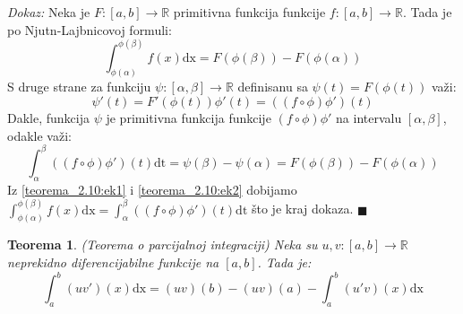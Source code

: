 \documentclass{article}
\newtheorem{teorema}{Teorema}[section]
\begin{document}
\textit{Dokaz:} Neka je $F:\left[a,b\right]\longrightarrow \mathbb{R}$ primitivna funkcija funkcije $f:\left[a,b\right]\longrightarrow\mathbb{R}$. Tada je po Njutn-Lajbnicovoj formuli:
\begin{equation}
    \label{teorema_2.10:ek1}
    \displaystyle\int^{\phi\left(\beta\right)}_{\phi\left(\alpha\right)}f\left(x\right)\text{dx} = F\left(\phi\left(\beta\right)\right)-F\left(\phi\left(\alpha\right)\right)
\end{equation}
S druge strane za funkciju $\psi:\left[\alpha,\beta\right]\longrightarrow\mathbb{R}$ definisanu sa $\psi\left(t\right) = F\left(\phi\left(t\right)\right)$ važi:
\begin{equation*}
    \psi'\left(t\right) = F'\left(\phi\left(t\right)\right)\phi'\left(t\right) = \left(\left(f\circ\phi\right)\phi'\right)\left(t\right)
\end{equation*}
Dakle, funkcija $\psi$ je primitivna funkcija funkcije $\left(f\circ\phi\right)\phi'$ na intervalu $\left[\alpha,\beta\right]$, odakle važi:
\begin{equation}
    \displaystyle\int^\beta_\alpha \left(\left(f\circ\phi\right)\phi'\right)\left(t\right)\text{dt} = \psi\left(\beta\right) - \psi\left(\alpha\right) = F\left(\phi\left(\beta\right)\right) - F\left(\phi\left(\alpha\right)\right)
    \label{teorema_2.10:ek2}
\end{equation}
Iz \eqref{teorema_2.10:ek1} i \eqref{teorema_2.10:ek2} dobijamo $\displaystyle\int^{\phi\left(\beta\right)}_{\phi\left(\alpha\right)} f\left(x\right)\text{dx} = \int^\beta_\alpha \left(\left(f\circ\phi\right)\phi'\right)\left(t\right)\text{dt}$ što je kraj dokaza.
\null\hfill $\blacksquare$\par

\begin{teoremabox}
    \label{teorema_2.11}
    \begin{teorema}
        (Teorema o parcijalnoj integraciji) Neka su $u, v: \left[a, b\right] \longrightarrow\mathbb{R}$ neprekidno diferencijabilne funkcije na $\left[a,b\right]$. Tada je:
        $$\displaystyle\int^b_a\left(uv'\right)\left(x\right)\text{dx} = \left(uv\right)\left(b\right) - \left(uv\right)\left(a\right) - \int^b_a\left(u'v\right)\left(x\right)\text{dx}$$
    \end{teorema}
\end{teoremabox}
\end{document}
